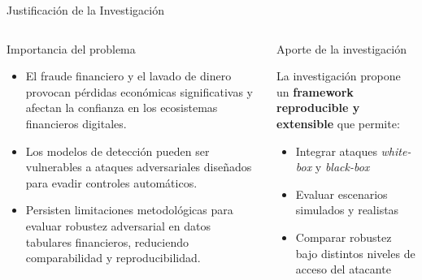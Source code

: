 \documentclass[aspectratio=169, 8pt]{beamer}
\begin{document}
\begin{frame}{Justificación de la Investigación}

\begin{columns}


\begin{block}{Importancia del problema}

\begin{itemize}

\item El fraude financiero y el lavado de dinero
provocan pérdidas económicas significativas
y afectan la confianza en los ecosistemas
financieros digitales.

\vspace{0.1cm}

\item Los modelos de detección pueden ser
vulnerables a ataques adversariales diseñados
para evadir controles automáticos.

\vspace{0.1cm}

\item Persisten limitaciones metodológicas
para evaluar robustez adversarial en datos
tabulares financieros, reduciendo
comparabilidad y reproducibilidad.

\end{itemize}

\end{block}




\begin{exampleblock}{Aporte de la investigación}

La investigación propone un
\textbf{framework reproducible y extensible}
que permite:

\begin{itemize}

\item Integrar ataques
\textit{white-box} y \textit{black-box}

\item Evaluar escenarios simulados
y realistas

\item Comparar robustez bajo distintos
niveles de acceso del atacante


\end{itemize}
\end{exampleblock}
\end{columns}
\end{frame}
\end{document}
